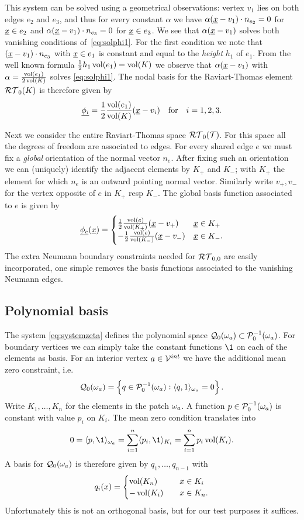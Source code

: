 \documentclass[thesis.tex]{subfiles}
\begin{document}
This system can be solved using a geometrical observations:
vertex $v_1$ lies on both edges $e_2$ and $e_3$, and thus for every constant $\alpha$  we have $\alpha(\underline{x} - v_1) \cdot n_{e_2} = 0$ for
$\underline{x} \in e_2$ and $\alpha(\underline{x} - v_1) \cdot  n_{e_3} = 0$ for $\underline{x} \in e_3$.
We see that $\alpha(\underline{x} - v_1)$ solves both vanishing conditions of~\eqref{eq:solphi1}.
For the first condition we note that $(\underline{x} - v_1) \cdot n_{e_3}$ with $\underline{x} \in e_1$ is constant and equal to the \emph{height} $h_1$ 
of $e_1$. From the well known formula $\frac{1}{2} h_1 \operatorname{vol}(e_1) = \operatorname{vol}(K)$
we observe that $\alpha(\underline{x} - v_1)$ with $\alpha = \frac{\operatorname{vol}(e_1)}{2\operatorname{vol}(K)}$ solves \eqref{eq:solphi1}. 
The nodal basis for the Raviart-Thomas element $\mathcal{RT}_0(K)$ is therefore given by
\[
  \underline{\phi_i} = \frac{1}{2}\frac{\operatorname{vol}(e_1)}{\operatorname{vol}(K)}( \underline{x} - v_i) \quad \text{for} \quad i=1,2,3.
\]

Next we consider the entire Raviart-Thomas space $\mathcal{RT}_0(\mathcal{T})$. For this space all the degrees of freedom are associated
to edges. For every shared edge $e$ we must fix a \emph{global} orientation of the normal vector $n_e$.
After fixing such an orientation we can (uniquely) identify the adjacent elements by $K_+$ and $K_-$; with $K_+$ the element for which $n_e$
is an outward pointing normal vector. Similarly write $v_+, v_-$ for the vertex opposite of $e$ in $K_+$ resp $K_-$. The
global basis function associated to $e$ is given by
\begin{equation}
  \label{eq:basisrt0}
  \underline{\phi_e}(\underline{x}) = \begin{cases}
    \frac{1}{2}\frac{\operatorname{vol}(e)}{\operatorname{vol}(K_+)}( \underline{x} - v_+) & \underline{x} \in K_+\\
    - \frac{1}{2}\frac{\operatorname{vol}(e)}{\operatorname{vol}(K_-)}( \underline{x} - v_-) & \underline{x} \in K_-.
\end{cases}
\end{equation}
The extra Neumann boundary constraints needed for $\mathcal{RT}_{0,0}$ are easily incorporated, one simple removes the
basis functions associated to the vanishing Neumann edges. 
\subsection{Polynomial basis}
The system \eqref{eq:systemzeta} defines the polynomial space $\mathcal{Q}_0(\omega_a) \subset \mathcal{P}_0^{-1}(\omega_a)$. For boundary
vertices we can simply take the constant functions $\1$ on each of the elements as basis. For an interior vertex $a \in \mathcal{V}^{int}$
we have the additional mean zero constraint, i.e.
\[
  \mathcal{Q}_0(\omega_a) = \set{q \in \mathcal{P}_0^{-1}(\omega_a) :  \langle q,1 \rangle_{\omega_a} = 0}.
\]
Write $K_1,\dots, K_n$ for the elements in the patch $\omega_a$. A function $p \in \mathcal{P}_0^{-1}(\omega_a)$ is constant
with value $p_i$ on $K_i$. The mean zero condition translates into
\[
  0 = \ip{p,\1}_{\w_a} = \sum_{i =1}^n \ip{p_i, \1}_{K_i} = \sum_{i=1}^n p_i \vol(K_i).
\]
A basis for $\mathcal{Q}_0(\omega_a)$ is therefore given by $q_1, \dots, q_{n-1}$ with
\[
  q_i(x) = \begin{cases}
    \operatorname{vol}(K_n) & \quad x \in K_i\\
    -\operatorname{vol}(K_i) & \quad x \in K_n.
  \end{cases}
\]
Unfortunately this is not an orthogonal basis, but for our test purposes it suffices.
\end{document}
